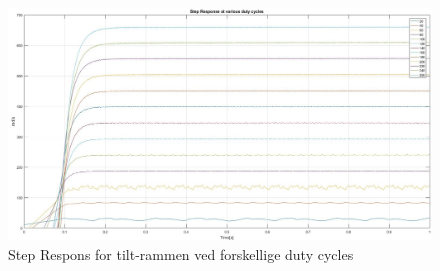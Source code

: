 \begin{figure}[ht]
	\begin{center}
		\includegraphics[scale=0.35]{Billeder/RPM_vs_DC.jpg}
	\end{center}
	\caption{Step Respons for tilt-rammen ved forskellige duty cycles}
	\label{fig:RPM_DC}
\end{figure}